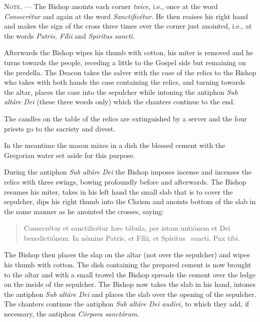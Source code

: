 \documentclass[letterpaper]{report}
\begin{document}
{    \textsc{Note. ---} The Bishop anoints each corner \textit{twice,} i.e.,
    once at the word \textit{Consecr\'etur} and again at the word
    \textit{Sanctific\'etur.} He then reaises his right hand and makes the sign
    of the cross three times over the corner just anointed, i.e., at the words
    \textit{Patris, F\'ilii} and \textit{Spiritus sancti.}

    \rubric Afterwards the Bishop wipes his thumb with cotton, his miter is
    removed and he turns towards the people, receding a little to the Gospel
    side but remaining on the predella. The Deacon takes the salver with the
    case of the relics to the Bishop who takes with both hands the case
    containing the relics, and turning towards the altar, places the case into
    the sepulcher while intoning the antiphon \textit{Sub alt\'are Dei} (these
    three words only) which the chanters continue to the end.

    The candles on the table of the relics are extinguished by a server and the
    four priests go to the sacristy and divest.

    In the meantime the mason mixes in a dish the blessed cement with the
    Gregorian water set aside for this purpose.

    \rubric During the antiphon \textit{Sub alt\'are Dei} the Bishop imposes
    incense and incenses the relics with three swings, bowing profoundly before
    and afterwards. The Bishop resumes his miter, takes in his left hand the
    small slab that is to cover the sepulcher, dips his right thumb into the
    Chrism and anoints bottom of the slab in the same manner as he anointed the
    crosses, saying:

    \begin{quote}
        Conse\cross crétur et sancti\cross ficétur h\ae c tábula, per istam
        untiónem et Dei benedictiónem. In nómine Pa\cross tris, et Fí\cross lii, et
        Spíritus \cross\ sancti. Pax tibi.
    \end{quote}

    \rubric The Bishop then places the slap on the altar (not over the
    sepulcher) and wipes his thumb with cotton. The dish containing the
    prepared cement is now brought to the altar and with a small trowel the
    Bishop spreads the cement over the ledge on the inside of the sepulcher.
    The Bishop now takes the slab in his hand, intones the antiphon \textit{Sub
    alt\'are Dei} and places the slab over the opening of the sepulcher. The
    chanters continue the antiphon \textit{Sub alt\'are Dei aud\'ivi,} to which
    they add, if necessary, the antiphon \textit{C\'orpora sanct\'orum.}

}
\end{document}
